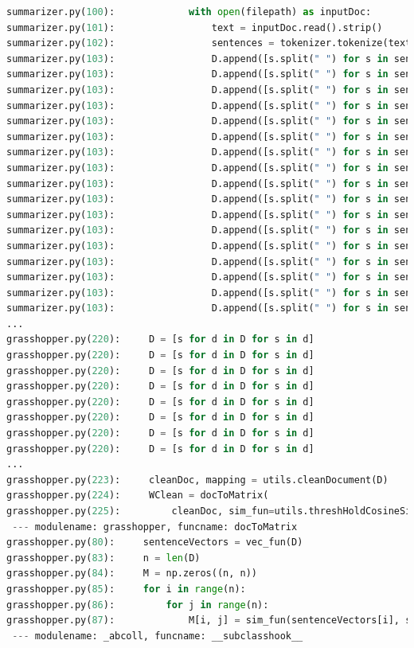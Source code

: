 \documentclass[10pt]{article}
\begin{document}
\begin{lstlisting}[breaklines,language=Python]
summarizer.py(100):             with open(filepath) as inputDoc:
summarizer.py(101):                 text = inputDoc.read().strip()
summarizer.py(102):                 sentences = tokenizer.tokenize(text)
summarizer.py(103):                 D.append([s.split(" ") for s in sentences])
summarizer.py(103):                 D.append([s.split(" ") for s in sentences])
summarizer.py(103):                 D.append([s.split(" ") for s in sentences])
summarizer.py(103):                 D.append([s.split(" ") for s in sentences])
summarizer.py(103):                 D.append([s.split(" ") for s in sentences])
summarizer.py(103):                 D.append([s.split(" ") for s in sentences])
summarizer.py(103):                 D.append([s.split(" ") for s in sentences])
summarizer.py(103):                 D.append([s.split(" ") for s in sentences])
summarizer.py(103):                 D.append([s.split(" ") for s in sentences])
summarizer.py(103):                 D.append([s.split(" ") for s in sentences])
summarizer.py(103):                 D.append([s.split(" ") for s in sentences])
summarizer.py(103):                 D.append([s.split(" ") for s in sentences])
summarizer.py(103):                 D.append([s.split(" ") for s in sentences])
summarizer.py(103):                 D.append([s.split(" ") for s in sentences])
summarizer.py(103):                 D.append([s.split(" ") for s in sentences])
summarizer.py(103):                 D.append([s.split(" ") for s in sentences])
summarizer.py(103):                 D.append([s.split(" ") for s in sentences])
...
grasshopper.py(220):     D = [s for d in D for s in d]
grasshopper.py(220):     D = [s for d in D for s in d]
grasshopper.py(220):     D = [s for d in D for s in d]
grasshopper.py(220):     D = [s for d in D for s in d]
grasshopper.py(220):     D = [s for d in D for s in d]
grasshopper.py(220):     D = [s for d in D for s in d]
grasshopper.py(220):     D = [s for d in D for s in d]
grasshopper.py(220):     D = [s for d in D for s in d]
...
grasshopper.py(223):     cleanDoc, mapping = utils.cleanDocument(D)
grasshopper.py(224):     WClean = docToMatrix(
grasshopper.py(225):         cleanDoc, sim_fun=utils.threshHoldCosineSim)
 --- modulename: grasshopper, funcname: docToMatrix
grasshopper.py(80):     sentenceVectors = vec_fun(D)
grasshopper.py(83):     n = len(D)
grasshopper.py(84):     M = np.zeros((n, n))
grasshopper.py(85):     for i in range(n):
grasshopper.py(86):         for j in range(n):
grasshopper.py(87):             M[i, j] = sim_fun(sentenceVectors[i], sentenceVectors[j])
 --- modulename: _abcoll, funcname: __subclasshook__

\end{lstlisting}
\end{document}
